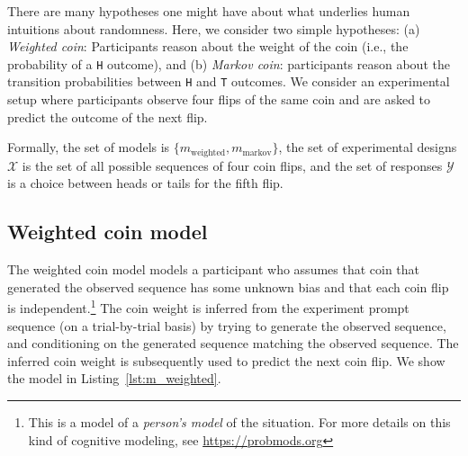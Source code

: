 \documentclass{article}
\begin{document}
There are many hypotheses one might have about what underlies human intuitions about randomness.
Here, we consider two simple hypotheses: (a) \emph{Weighted coin}: Participants reason about the weight of the coin (i.e., the probability of a \lstinline{H} outcome), and (b) \emph{Markov coin}: participants reason about the transition probabilities between \lstinline{H} and \lstinline{T} outcomes.
We consider an experimental setup where participants observe four flips of the same coin and are asked to predict the outcome of the next flip.

Formally, the set of models is $\{m_{\textrm{weighted}}, m_{\text{markov}}\}$, the set of experimental designs $\mathcal{X}$ is the set of all possible sequences of four coin flips, and the set of responses $\mathcal{Y}$ is a choice between heads or tails for the fifth flip.

\subsection{Weighted coin model}
\label{s:tutorial:sss:biased}

The weighted coin model models a participant who assumes that coin that generated the observed sequence has some unknown bias and that each coin flip is independent.\footnote{This is a model of a \emph{person's model} of the situation. For more details on this kind of cognitive modeling, see \url{https://probmods.org}}
The coin weight is inferred from the experiment prompt sequence (on a trial-by-trial basis) by trying to generate the observed sequence, and conditioning on the generated sequence matching the observed sequence.
The inferred coin weight is subsequently used to predict the next coin flip. We show the model in Listing~\ref{lst:m_weighted}.
\end{document}
